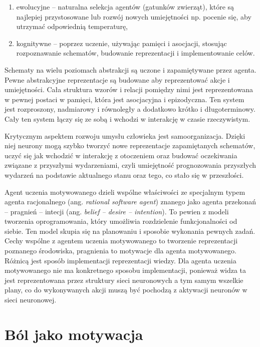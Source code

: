 \begin{enumerate}
	\item ewolucyjne -- naturalna selekcja agentów (gatunków zwierząt), które 
	są najlepiej przystosowane lub rozwój nowych umiejętności np. pocenie się, 
	aby utrzymać odpowiednią temperaturę,
	
	\item kognitywne -- poprzez uczenie, używając pamięci i asocjacji, stosując 
	rozpoznawanie schematów, budowanie reprezentacji i implementowanie celów.
\end{enumerate}

Schematy na wielu poziomach abstrakcji są uczone i zapamiętywane przez agenta. 
Pewne abstrakcyjne reprezentacje są budowane aby reprezentować akcje i 
umiejętności. Cała struktura wzorów i relacji pomiędzy nimi jest reprezentowana 
w pewnej postaci w pamięci, która jest asocjacyjna i epizodyczna. Ten system 
jest rozproszony, nadmiarowy i równoległy a dodatkowo krótko i długoterminowy. 
Cały ten system łączy się ze sobą i wchodzi w interakcję w czasie rzeczywistym.

Krytycznym aspektem rozwoju umysłu człowieka jest samoorganizacja. Dzięki niej 
neurony mogą szybko tworzyć nowe reprezentacje zapamiętanych schematów, uczyć 
się jak wchodzić w interakcję z otoczeniem oraz budować oczekiwania związane z 
przyszłymi wydarzeniami, czyli umiejętność prognozowania przyszłych wydarzeń na 
podstawie aktualnego stanu oraz tego, co stało się w przeszłości.

Agent uczenia motywowanego dzieli wspólne właściwości ze specjalnym typem 
agenta racjonalnego (ang. \textit{rational software agent}) znanego jako agenta 
przekonań -- pragnień -- intecji (ang. \textit{belief -- desire -- intention}). 
To pewien z modeli tworzenia oprogramowania, który umożliwia rozdzielenie 
funkcjonalności od siebie. Ten model skupia się na planowaniu i sposobie 
wykonania pewnych zadań. Cechy wspólne z agentem uczenia motywowanego to 
tworzenie reprezentacji poznanego środowiska, pragnienia to motywacje dla 
agenta motywowanego. Różnicą jest sposób implementacji reprezentacji wiedzy. 
Dla agenta uczenia motywowanego nie ma konkretnego sposobu implementacji, 
ponieważ widza ta jest reprezentowana przez struktury sieci neuronowych a tym 
samym wszelkie plany, co do wykonywanych akcji muszą być pochodzą z aktywacji 
neuronów w sieci neuronowej.


\section{Ból jako motywacja}

